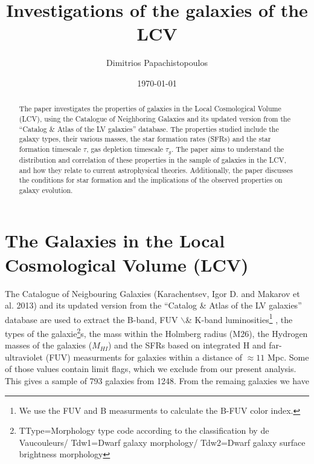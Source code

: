 \documentclass[a4paper,twocolumn]{article}
\author{Dimitrios Papachistopoulos}
\date{\today}
\title{Investigations of the galaxies of the LCV}
\begin{document}
\maketitle
\begin{abstract}
The paper investigates the properties of galaxies in the Local Cosmological Volume (LCV), using the Catalogue of Neighboring Galaxies\autocite{karachentsevUPDATEDNEARBYGALAXY2013} and its updated version from the ``Catalog \& Atlas of the LV galaxies'' database\autocite{CatalogLVGalaxies}. The properties studied include the galaxy types, their various masses, the star formation rates (SFRs) and the star formation timescale \(\tau\), gas depletion timescale \(\tau_g\). The paper aims to understand the distribution and correlation of these properties in the sample of galaxies in the LCV, and how they relate to current astrophysical theories. Additionally, the paper discusses the conditions for star formation and the implications of the observed properties on galaxy evolution.
\end{abstract}

\section{The Galaxies in the Local Cosmological Volume (LCV)}
\label{sec:org6580427}

The Catalogue of Neigbouring Galaxies (Karachentsev, Igor D. and Makarov  et al. 2013\autocite{karachentsevUPDATEDNEARBYGALAXY2013}) and its updated version from the ``Catalog \& Atlas of the LV galaxies'' database\autocite{CatalogLVGalaxies}  are used to extract the B-band, FUV $\backslash$& K-band luminosities\footnote{We use the FUV and B measurments to calculate the B-FUV color index.} , the types of the galaxie\footnote{TType=Morphology type code according to the classification by de Vaucouleurs/ Tdw1=Dwarf galaxy morphology/ Tdw2=Dwarf galaxy surface brightness morphology}s, the mass within the Holmberg radius (M26), the Hydrogen masses of the galaxies (\(M_{HI}\)) and the SFRs based on integrated  H and far-ultraviolet (FUV) measurments for galaxies within a distance of
\(\approx 11\) Mpc. Some of those values contain limit flags, which we exclude from our present analysis. This gives a sample of 793 galaxies from 1248. From the remaing galaxies we have
\end{document}
